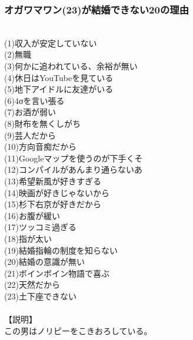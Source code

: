 \documentclass[12pt]{jsarticle}
\begin{document}
\subsubsection{オガワマワン(23)が結婚できない20の理由}
　\\
(1)収入が安定していない\\
(2)無職\\
(3)何かに追われている、余裕が無い\\
(4)休日はYouTubeを見ている\\
(5)地下アイドルに友達がいる\\
(6)4σを言い張る\\
(7)お酒が弱い\\
(8)財布を無くしがち\\
(9)芸人だから\\
(10)方向音痴だから\\
(11)Googleマップを使うのが下手くそ\\
(12)コンパイルがあんまり通らないあ\\
(13)希望新風が好きすぎる\\
(14)映画が好きじゃないから\\
(15)杉下右京が好きだから\\
(16)お腹が緩い\\
(17)ツッコミ過ぎる\\
(18)指が太い\\
(19)結婚指輪の制度を知らない\\
(20)結婚の意識が無い\\
(21)ボインボイン物語で喜ぶ\\
(22)天然だから\\
(23)土下座できない\\
\\
【説明】\\
この男はノリピーをこきおろしている。\\

\newpage
\end{document}
